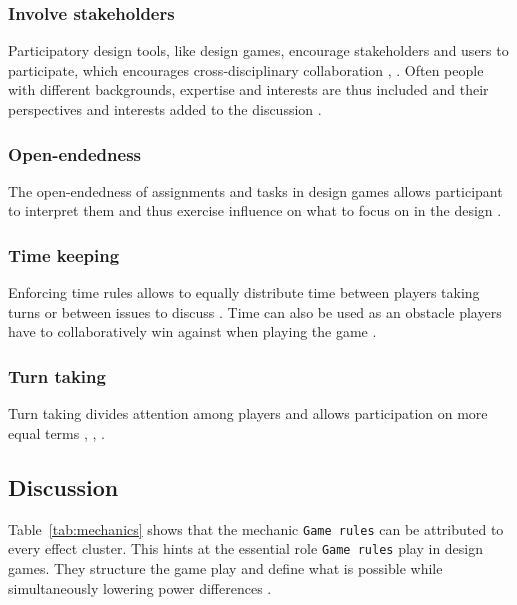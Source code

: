 \documentclass[draft,twoside]{vutinfth}
\begin{document}
            \subsubsection{Involve stakeholders}
            Participatory design tools, like design games, encourage stakeholders and users to participate, which encourages 
            cross-disciplinary collaboration \cite{nymarkernstsenTechnologyCardsDesign2023}, \cite{zhangAddressingCulturalInertias2024}. 
            Often people with different backgrounds, expertise and interests are thus included and their perspectives and interests 
            added to the discussion \cite{bunaesRulesPlayBalance2024}. 

            \subsubsection{Open-endedness}
            The open-endedness of assignments and tasks in design games allows participant to interpret them and thus exercise 
            influence on what to focus on in the design \cite{brandtDesigningExploratoryDesign2006}.

            \subsubsection{Time keeping}
            Enforcing time rules allows to equally distribute time between players taking turns or between issues to discuss \cite{eriksenTakingDesignGames2014}. 
            Time can also be used as an obstacle players have to collaboratively win against when playing the game \cite{fikarGroundedTheoryZur2023}.

            \subsubsection{Turn taking}
            Turn taking divides attention among players and allows participation on more equal terms \cite{brandtDesigningExploratoryDesign2006}, 
            \cite{eriksenTakingDesignGames2014}, \cite{hatamiFacilitatingServiceInteractions2016}.
            

        \subsection{Discussion}
        Table~\ref{tab:mechanics} shows that the mechanic \lstinline|Game rules| can be attributed to every effect cluster. 
        This hints at the essential role \lstinline|Game rules| play in design games. They structure the game play and define 
        what is possible while simultaneously lowering power differences \cite{brandtFacilitatingCollaborationDesign2004a,vaajakallioDesignGamesCodesign2014,fikarGroundedTheoryZur2023}. 
\end{document}
